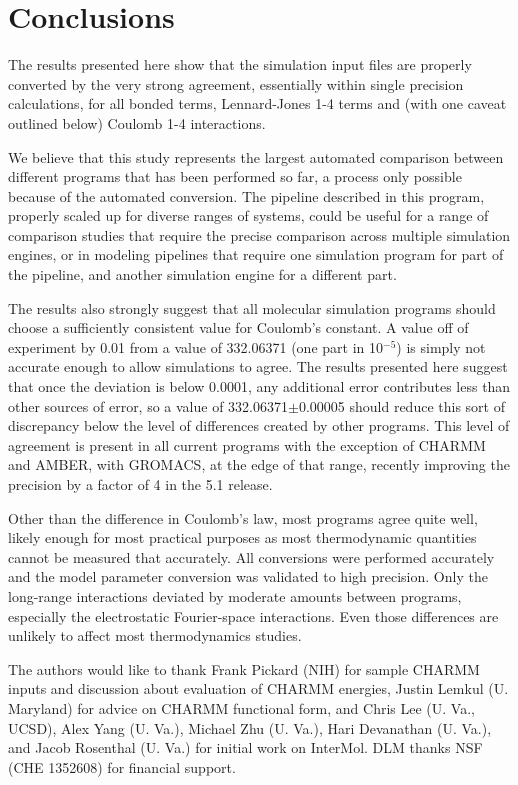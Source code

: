 \section*{Conclusions}
The results presented here show that the simulation input files are
properly converted by the very strong agreement, essentially within
single precision calculations, for all bonded terms, Lennard-Jones 1-4
terms and (with one caveat outlined below) Coulomb 1-4 interactions. 

We believe that this study represents the largest automated comparison
between different programs that has been performed so far, a process
only possible because of the automated conversion. The pipeline
described in this program, properly scaled up for diverse ranges of
systems, could be useful for a range of comparison studies that
require the precise comparison across multiple simulation engines, or
in modeling pipelines that require one simulation program for part of
the pipeline, and another simulation engine for a different part.

The results also strongly suggest that all molecular simulation
programs should choose a sufficiently consistent value for Coulomb's
constant. A value off of experiment by 0.01 from a value of 332.06371
(one part in 10$^{-5}$) is simply not accurate enough to allow
simulations to agree.  The results presented here suggest that once
the deviation is below 0.0001, any additional error contributes less
than other sources of error, so a value of 332.06371$\pm$0.00005
should reduce this sort of discrepancy below the level of differences
created by other programs.  This level of agreement is present in all
current programs with the exception of CHARMM and AMBER, with GROMACS,
at the edge of that range, recently improving the precision by a
factor of 4 in the 5.1 release.

Other than the difference in Coulomb's law, most programs agree quite
well, likely enough for most practical purposes as most thermodynamic
quantities cannot be measured that accurately.  All conversions were
performed accurately and the model parameter conversion was validated
to high precision. Only the long-range interactions deviated by
moderate amounts between programs, especially the electrostatic
Fourier-space interactions.  Even those differences are unlikely to
affect most thermodynamics studies.

\begin{acknowledgements}
The authors would like to thank Frank Pickard (NIH) for sample CHARMM
inputs and discussion about evaluation of CHARMM energies, Justin
Lemkul (U. Maryland) for advice on CHARMM functional form, and Chris
Lee (U. Va., UCSD), Alex Yang (U. Va.), Michael Zhu (U. Va.), Hari
Devanathan (U. Va.), and Jacob Rosenthal (U. Va.)  for initial work on
InterMol. DLM thanks NSF (CHE 1352608) for financial support.
\end{acknowledgements}

